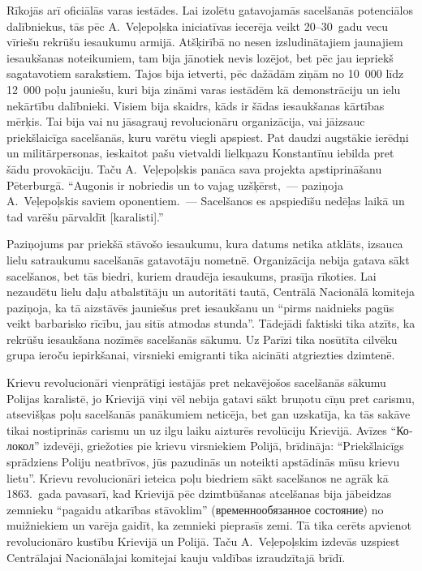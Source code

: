 \documentclass[twoside,a5paper,12pt,fleqn,openany]{extbook}
\newcommand{\rutxti}[1]{\textrussian{#1}}
\begin{document}
Rīkojās arī oficiālās varas iestādes. Lai izolētu gatavojamās sacelšanās potenciālos dalībniekus, tās pēc A.~Veļepoļska iniciatīvas iecerēja veikt 20--30~gadu vecu vīriešu rekrūšu iesaukumu armijā. Atšķirībā no nesen izsludinātajiem jaunajiem iesaukšanas noteikumiem, tam bija jānotiek nevis lozējot, bet pēc jau iepriekš sagatavotiem sarakstiem. Tajos bija ietverti, pēc dažādām ziņām no 10~000 līdz 12~000 poļu jauniešu, kuri bija zināmi varas iestādēm kā demonstrāciju un ielu nekārtību dalībnieki. Visiem bija skaidrs, kāds ir šādas iesaukšanas kārtības mērķis. Tai bija vai nu jāsagrauj revolucionāru organizācija, vai jāizsauc priekšlaicīga sacelšanās, kuru varētu viegli apspiest. Pat daudzi augstākie ierēdņi un militārpersonas, ieskaitot pašu vietvaldi lielkņazu Konstantīnu iebilda pret šādu provokāciju. Taču A.~Veļepoļskis panāca sava projekta apstiprināšanu Pēterburgā. ``Augonis ir nobriedis un to vajag uzšķērst,~--- paziņoja A.~Veļepoļskis saviem oponentiem.~--- Sacelšanos es apspiedīšu nedēļas laikā un tad varēšu pārvaldīt [karalisti].''

Paziņojums par priekšā stāvošo iesaukumu, kura datums netika atklāts, izsauca lielu satraukumu sacelšanās gatavotāju nometnē. Organizācija nebija gatava sākt sacelšanos, bet tās biedri, kuriem draudēja iesaukums, prasīja rīkoties. Lai nezaudētu lielu daļu atbalstītāju un autoritāti tautā, Centrālā Nacionālā komiteja paziņoja, ka tā aizstāvēs jauniešus pret iesaukšanu un ``pirms naidnieks pagūs veikt barbarisko rīcību, jau sitīs atmodas stunda''. Tādejādi faktiski tika atzīts, ka rekrūšu iesaukšana nozīmēs sacelšanās sākumu. Uz Parīzi tika nosūtīta cilvēku grupa ieroču iepirkšanai, virsnieki emigranti tika aicināti atgriezties dzimtenē.

Krievu revolucionāri vienprātīgi iestājās pret nekavējošos sacelšanās sākumu Polijas karalistē, jo Krievijā viņi vēl nebija gatavi sākt bruņotu cīņu pret carismu, atsevišķas poļu sacelšanās panākumiem neticēja, bet gan uzskatīja, ka tās sakāve tikai nostiprinās carismu un uz ilgu laiku aizturēs revolūciju Krievijā. Avīzes ``\rutxti{Колокол}'' izdevēji, griežoties pie krievu virsniekiem Polijā, brīdināja: ``Priekšlaicīgs sprādziens Poliju neatbrīvos, jūs pazudinās un noteikti apstādinās mūsu krievu lietu''. Krievu revolucionāri ieteica poļu biedriem sākt sacelšanos ne agrāk kā 1863.~gada pavasarī, kad Krievijā pēc dzimtbūšanas atcelšanas bija jābeidzas zemnieku ``pagaidu atkarības stāvoklim'' (\rutxti{временнообязанное состояние}) no muižniekiem un varēja gaidīt, ka zemnieki pieprasīs zemi. Tā tika cerēts apvienot revolucionāro kustību Krievijā un Polijā. Taču A.~Veļepoļskim izdevās uzspiest Centrālajai Nacionālajai komitejai kauju valdības izraudzītajā brīdī.
\end{document}
